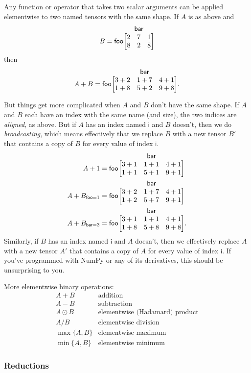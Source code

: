 \documentclass{article}
\makeatletter
\newcommand{\name}[1]{\mathsf{#1}}
\newcommand{\nidx}[2]{\name{#1}=#2}
\newcommand{\nmatrix}[3]{\name{#1}\begin{array}[b]{@{}c@{}}\name{#2}\\\begin{bmatrix}#3\end{bmatrix}\end{array}}
\makeatother
\begin{document}
Any function or operator that takes two scalar arguments can be applied elementwise to two named tensors with the same shape. If $A$ is as above and
\begin{equation*}
B = \nmatrix{foo}{bar}{
  2 & 7 & 1 \\
  8 & 2 & 8
}
\end{equation*}
then
\begin{equation*}
A + B = \nmatrix{foo}{bar}{
  3+2 & 1+7 & 4+1 \\
  1+8 & 5+2 & 9+8
}.
\end{equation*}

But things get more complicated when $A$ and $B$ don't have the same shape. If $A$ and $B$ each have an index with the same name (and size), the two indices are \emph{aligned}, as above. But if $A$ has an index named $\name{i}$ and $B$ doesn't, then we do \emph{broadcasting}, which means effectively that we replace $B$ with a new tensor $B'$ that contains a copy of $B$ for every value of index $\name{i}$.
\begin{align*}
A + 1 &= \nmatrix{foo}{bar}{
  3+1 & 1+1 & 4+1 \\
  1+1 & 5+1 & 9+1
} \\
A + B_{\nidx{foo}{1}} &= \nmatrix{foo}{bar}{
  3+2 & 1+7 & 4+1 \\
  1+2 & 5+7 & 9+1
} \\
A + B_{\nidx{bar}{3}} &= \nmatrix{foo}{bar}{
  3+1 & 1+1 & 4+1 \\
  1+8 & 5+8 & 9+8
}.
\end{align*}
Similarly, if $B$ has an index named $\name{i}$ and $A$ doesn't, then we effectively replace $A$ with a new tensor $A'$ that contains a copy of $A$ for every value of index $\name{i}$. If you've programmed with NumPy or any of its derivatives, this should be unsurprising to you.

More elementwise binary operations:
\[\begin{array}{cl}
A+B & \text{addition} \\
A-B & \text{subtraction} \\
A\odot B & \text{elementwise (Hadamard) product} \\
A / B & \text{elementwise division} \\
\max \{A, B\} & \text{elementwise maximum} \\
\min \{A, B\} & \text{elementwise minimum}
\end{array}\]

\subsubsection{Reductions}
\end{document}
